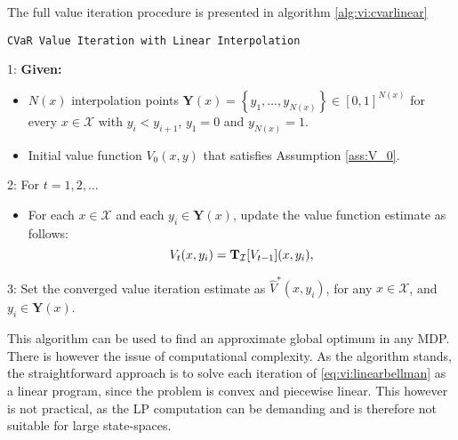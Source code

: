 The full value iteration procedure is presented in algorithm \ref{alg:vi:cvarlinear}

\begin{algorithm}[h]
\caption{\texttt{CVaR Value Iteration with Linear Interpolation}}\label{alg:vi:cvarlinear}
1: \textbf{Given:}
\begin{itemize}
\item $N(x)$ interpolation points $\mathbf{Y}(x)  = \left\{y_1,\dots,y_{N(x)}\right\} \in [0,1]^{N(x)}$ for every $x\in \mathcal X$ with $y_i<y_{i+1}$, $y_1=0$ and $y_{N(x)}=1$.
\item Initial value function $V_0(x,y)$ that satisfies Assumption \ref{ass:V_0}.
\end{itemize}
2: For $t = 1,2,\dots$
\begin{itemize}
\item For each $x \in \mathcal X$ and each $y_i\in \mathbf{Y}(x)$, update the value function estimate as follows:
  \begin{equation*}
   V_t(x,y_i)= \mathbf{T}_{\mathcal{I}}[V_{t-1}](x,y_i),
  \end{equation*}
  \end{itemize}
3: Set the converged value iteration estimate as $\widehat{V}^*(x,y_i)$, for any $x\in\mathcal X$, and $ y_i\in\mathbf{Y}(x)$.
\end{algorithm}

This algorithm can be used to find an approximate global optimum in any MDP. There is however the issue of computational complexity. As the algorithm stands, the straightforward approach is to solve each iteration of \ref{eq:vi:linearbellman} as a linear program, since the problem is convex and piecewise linear. This however is not practical, as the LP computation can be demanding and is therefore not suitable for large state-spaces.

